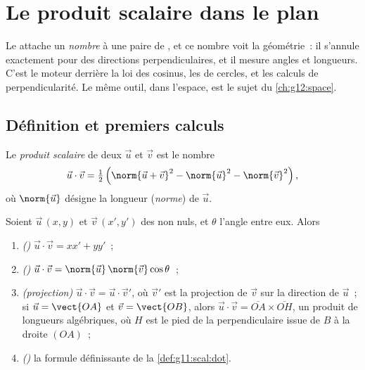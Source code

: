 \chapter{Le produit scalaire dans le plan}\label{ch:g11:scal}

Le  attache un \emph{nombre} à une paire de , et
ce nombre voit la géométrie~: il s'annule exactement pour des directions
perpendiculaires, et il mesure angles et longueurs. C'est le moteur
derrière la loi des cosinus, les  de cercles, et les calculs de
perpendicularité. Le même outil, dans l'espace, est le sujet du
\cref{ch:g12:space}.

\section{Définition et premiers calculs}

\begin{definition}\label{def:g11:scal:dot}
Le \emph{produit scalaire} de deux 
$\vec u$ et $\vec v$ est le nombre
\[
\vec u \cdot \vec v
= \tfrac12\left(\norm{\vec u + \vec v}^2 - \norm{\vec u}^2
- \norm{\vec v}^2\right),
\]
où $\norm{\vec u}$ désigne la longueur (\emph{norme}) de $\vec u$.
\end{definition}

\begin{theorem}\label{thm:g11:scal:faces}
Soient $\vec u\,(x, y)$ et $\vec v\,(x', y')$ des  non nuls, et
$\theta$ l'angle entre eux. Alors
\begin{enumerate}
  \item \emph{()} $\vec u \cdot \vec v = xx' + yy'$~;
  \item \emph{()} $\vec u \cdot \vec v =
        \norm{\vec u}\,\norm{\vec v}\cos\theta$~;
  \item \emph{(projection)} $\vec u \cdot \vec v = \vec u \cdot \vec v'$,
        où $\vec v'$ est la projection  de $\vec v$ sur la
        direction de $\vec u$~; si $\vec u = \vect{OA}$ et
        $\vec v = \vect{OB}$, alors
        $\vec u \cdot \vec v = \overline{OA} \times \overline{OH}$, un
        produit de longueurs algébriques, où $H$ est le pied de la
        perpendiculaire issue de $B$ à la droite $(OA)$~;
  \item \emph{()} la formule définissante de la
        \cref{def:g11:scal:dot}.
\end{enumerate}
\end{theorem}

